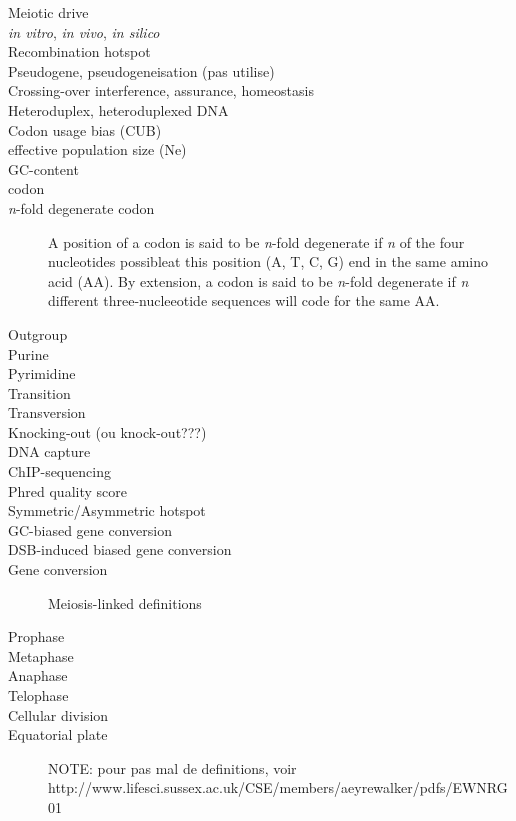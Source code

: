 \begin{alwayssingle}
\begin{description}
		\item[Meiotic drive]
		\item[\textit{in vitro}, \textit{in vivo}, \textit{in silico}]
		\item[Recombination hotspot]
		\item[Pseudogene, pseudogeneisation (pas utilise)]
		\item[Crossing-over interference, assurance, homeostasis]
		\item[Heteroduplex, heteroduplexed DNA]
		\item[Codon usage bias (CUB)]
		\item[effective population size (Ne)]
\item[GC-content]
\item[codon]
\item[\textit{n}-fold degenerate codon] A position of a codon is said to be \textit{n}-fold degenerate if \textit{n} of the four nucleotides possibleat this position (A, T, C, G) end in the same amino acid (AA). By extension, a codon is said to be \textit{n}-fold degenerate if \textit{n} different three-nucleeotide sequences will code for the same AA\@.
\item[Outgroup]
\item[Purine]
\item[Pyrimidine]
\item[Transition]
\item[Transversion]
\item[Knocking-out (ou knock-out???)]
\item[DNA capture]
\item[ChIP-sequencing]
\item[Phred quality score]
\item[Symmetric/Asymmetric hotspot]
\item[GC-biased gene conversion]
\item[DSB-induced biased gene conversion]
\item[Gene conversion]


Meiosis-linked definitions
\item[Prophase]
\item[Metaphase]
\item[Anaphase]
\item[Telophase]
\item[Cellular division]
\item[Equatorial plate]


NOTE\@: pour pas mal de definitions, voir http://www.lifesci.sussex.ac.uk/CSE/members/aeyrewalker/pdfs/EWNRG01%


	\end{description}
\end{alwayssingle}
\mtcaddchapter{}


